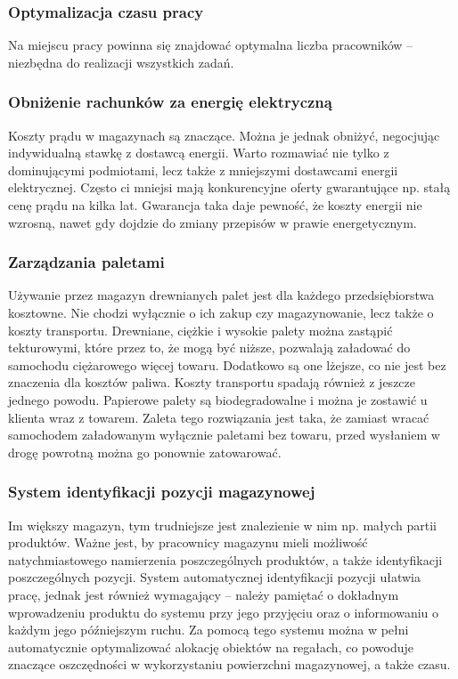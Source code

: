 \subsubsection{Optymalizacja czasu pracy}
Na miejscu pracy powinna się znajdować optymalna liczba pracowników – niezbędna do realizacji wszystkich zadań.
\subsubsection{Obniżenie rachunków za energię elektryczną}
Koszty prądu w magazynach są znaczące. Można je jednak obniżyć, negocjując indywidualną stawkę z dostawcą energii. Warto rozmawiać nie tylko z dominującymi podmiotami, lecz także z mniejszymi dostawcami energii elektrycznej. Często ci mniejsi mają konkurencyjne oferty gwarantujące np. stałą cenę prądu na kilka lat. Gwarancja taka daje pewność, że koszty energii nie wzrosną, nawet gdy dojdzie do zmiany przepisów w prawie energetycznym.
\subsubsection{Zarządzania paletami}
Używanie przez magazyn drewnianych palet jest dla każdego przedsiębiorstwa kosztowne. Nie chodzi wyłącznie o ich zakup czy magazynowanie, lecz także o koszty transportu. Drewniane, ciężkie i wysokie palety można zastąpić tekturowymi, które przez to, że mogą być niższe, pozwalają załadować do samochodu ciężarowego więcej towaru. Dodatkowo są one lżejsze, co nie jest bez znaczenia dla kosztów paliwa. Koszty transportu spadają również z jeszcze jednego powodu. Papierowe palety są biodegradowalne i można je zostawić u klienta wraz z towarem. Zaleta tego rozwiązania jest taka, że zamiast wracać samochodem załadowanym wyłącznie paletami bez towaru, przed wysłaniem w drogę powrotną można go ponownie zatowarować.
\subsubsection{System identyfikacji pozycji magazynowej}
Im większy magazyn, tym trudniejsze jest znalezienie w nim np. małych partii produktów. Ważne jest, by pracownicy magazynu mieli możliwość natychmiastowego namierzenia poszczególnych produktów, a także identyfikacji poszczególnych pozycji. System automatycznej identyfikacji pozycji ułatwia pracę, jednak jest również wymagający – należy pamiętać o dokładnym wprowadzeniu produktu do systemu przy jego przyjęciu oraz o informowaniu o każdym jego późniejszym ruchu. Za pomocą tego systemu można w pełni automatycznie optymalizować alokację obiektów na regałach, co powoduje znaczące oszczędności w wykorzystaniu powierzchni magazynowej, a także czasu.
